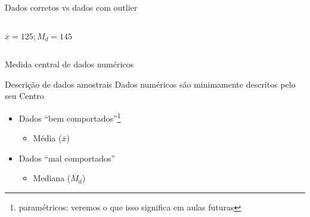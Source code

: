 \documentclass{beamer}
\begin{document}
\begin{frame}{\scriptsize Dados corretos vs dados com outlier}
\begin{columns}
\begin{column}{5cm}
\begin{center}
        \scriptsize
        \bigskip
        $\bar{x} = 125 ; M_d= 145$
      \end{center}
    \end{column}
  \end{columns}
\end{frame}

\begin{frame}{\scriptsize Medida central de dados numéricos}
  \begin{block}{Descrição de dados amostrais}
    \scriptsize
    Dados numéricos são minimamente descritos pelo seu Centro

    \bigskip
    \begin{itemize}
      \footnotesize
    \item Dados ``bem comportados''\footnote{\scriptsize paramétricos: veremos o que isso significa em aulas futuras}
      \begin{itemize}
        \scriptsize
      \item Média \Left($\bar{x}$\Right)
      \end{itemize}
      \bigskip
    \item Dados ``mal comportados''
      \begin{itemize}
        \scriptsize
      \item Mediana \Left($M_d$\Right)
      \end{itemize}
    \end{itemize}
  \end{block}
\end{frame}

\end{document}
